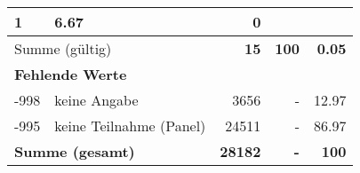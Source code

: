 \begin{longtable}{lXrrr}
       \num{1} &
       \num[round-mode=places,round-precision=2]{6.67} &
         \num[round-mode=places,round-precision=2]{0} \\
     \midrule
     \multicolumn{2}{l}{Summe (gültig)} &
       \textbf{\num{15}} &
     \textbf{100} &
       \textbf{\num[round-mode=places,round-precision=2]{0.05}} \\
     \multicolumn{5}{l}{\textbf{Fehlende Werte}}\\
       -998 &
       keine Angabe &
         \num{3656} &
        - &
         \num[round-mode=places,round-precision=2]{12.97} \\
       -995 &
       keine Teilnahme (Panel) &
         \num{24511} &
        - &
         \num[round-mode=places,round-precision=2]{86.97} \\
     \midrule
     \multicolumn{2}{l}{\textbf{Summe (gesamt)}} &
          \textbf{\num{28182}} &
        \textbf{-} &
        \textbf{100} \\
     \bottomrule
     \end{longtable}
     
